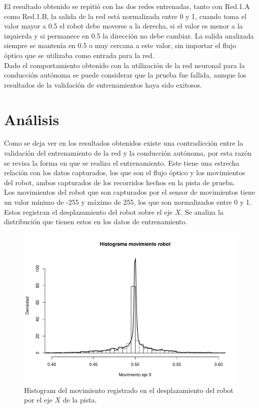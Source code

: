\documentclass{iccmemoria}
\begin{document}
El resultado obtenido se repitió con las dos redes entrenadas, tanto con Red.1.A como Red.1.B, la salida de la red está normalizada entre 0 y 1, cuando toma el valor mayor a 0.5 el robot debe moverse a la derecha, si el valor es menor a la izquierda y si permanece en 0.5 la dirección no debe cambiar. La salida analizada siempre se mantenía en 0.5 o muy cercana a este valor, sin importar el flujo óptico que se utilizaba como entrada para la red.\\

Dado el comportamiento obtenido con la utilización de la red neuronal para la conducción autónoma se puede considerar que la prueba fue fallida, aunque los resultados de la validación de entrenamientos haya sido exitosos.\\

\section{Análisis}

Como se deja ver en los resultados obtenidos existe una contradicción entre la validación del entrenamiento de la red y la conducción autónoma, por esta razón se revisa la forma en que se realiza el entrenamiento. Este tiene una estrecha relación con los datos capturados, los que son el flujo óptico y los movimientos del robot, ambos capturados de los recorridos hechos en la pista de prueba.\\

Los movimientos del robot que son capturados por el sensor de movimientos tiene un valor mínimo de -255 y máximo de 255, los que son normalizados entre 0 y 1. Estos registran el desplazamiento del robot sobre el eje $X$. Se analiza la distribución que tienen estos en los datos de entrenamiento.\\

\begin{figure}[H]
  \centering
  \includegraphics[width = 450pt]{images/hist_motion_robot.pdf}
  \caption[Histograma movimiento robot en el eje $X$]{Histogram del movimiento registrado en el desplazamiento del robot por el eje $X$ de la pista.}
  \label{fig:hist motion robot}
\end{figure}
\end{document}
